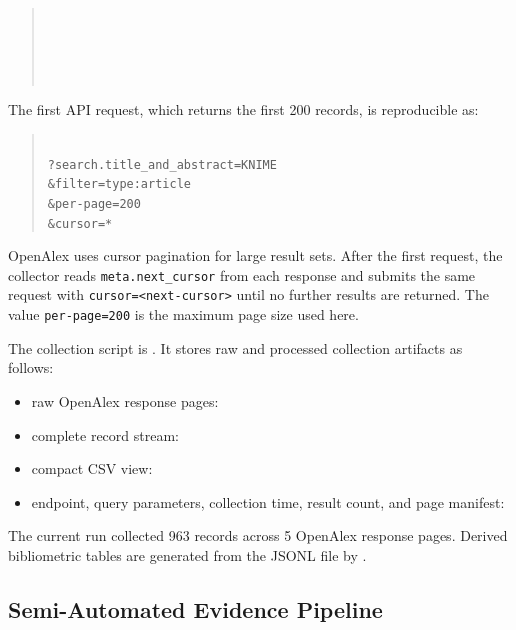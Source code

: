 \documentclass[runningheads]{llncs}
\begin{document}
\begin{quote}
\\
\\
\\
\\
\end{quote}

The first API request, which returns the first 200 records, is reproducible as:

\begin{quote}
\\
\texttt{?search.title\_and\_abstract=KNIME}\\
\texttt{\&filter=type:article}\\
\texttt{\&per-page=200}\\
\texttt{\&cursor=*}
\end{quote}

OpenAlex uses cursor pagination for large result sets. After the first request,
the collector reads \texttt{meta.next\_cursor} from each response and submits
the same request with \texttt{cursor=<next-cursor>} until no further results
are returned. The value \texttt{per-page=200} is the maximum page size used
here.

The collection script is
.
It stores raw and processed collection artifacts as follows:
\begin{itemize}
\item raw OpenAlex response pages:
\item complete record stream:
\item compact CSV view:
\item endpoint, query parameters, collection time, result count, and page
manifest:
\end{itemize}
The current run collected 963 records across 5 OpenAlex response pages.
Derived bibliometric tables are generated from the JSONL file by
.

\subsection{Semi-Automated Evidence Pipeline}
\end{document}
